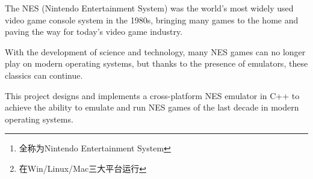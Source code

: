 \documentclass[a4paper]{ltxdoc}
\begin{document}





\begin{abstract}
	NES\footnote{全称为Nintendo Entertainment System}(任天堂娱乐系统)在20世纪80年代是世界上使用最广泛的电子游戏系统，将许多游戏带入了家庭，并为当今电子游戏产业铺平了道路。

	随着科技的发展，许多NES游戏已经无法在当今系统上游玩，然而归功于模拟器的存在，使得这些经典能够延续下去。

	本课题设计并用C++实现一个跨平台\footnote{在Win/Linux/Mac三大平台运行}的NES模拟器，以达到在现代操作系统中能够模拟并运行上个年代的NES游戏。

\end{abstract}

\begin{abstractEn}
	The NES (Nintendo Entertainment System) was the world's most widely used video game console system in the 1980s, bringing many games to the home and paving the way for today's video game industry.

	With the development of science and technology, many NES games can no longer play on modern operating systems, but thanks to the presence of emulators, these classics can continue.

	This project designs and implements a cross-platform NES emulator in C++ to achieve the ability to emulate and run NES games of the last decade in modern operating systems.

\end{abstractEn}

{
\setlength{\cftfignumwidth}{3.5em}
\setlength{\cfttabnumwidth}{3.5em}
\clearpage
\tableofcontents

\clearpage
\listoffigures

\clearpage
\listoftables

\setcounter{page}{0}
}

\fancyhead{}
\pagestyle{fancy}
\end{document}
